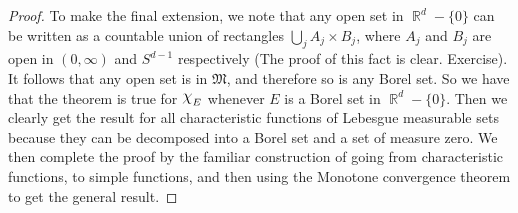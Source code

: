 \documentclass{article}
\DeclareMathOperator{\R}{\mathbb{R}}
\DeclareMathOperator{\capchi}{\raisebox{2pt}{$\mathlarger{\mathlarger{\chi}}$}}
\begin{document}
\begin{proof}
  To make the final extension, we note that any open set in $\R^d -
  \{0\}$ can be written as a countable union of rectangles $ \bigcup_j
  A_j \times B_j$, where $A_j$ and $B_j$ are open in $(0,\infty)$ and
  $S^{d-1}$ respectively (The proof of this fact is
  clear. Exercise). It follows that any open set is in $\mathfrak{M}$,
  and therefore so is any Borel set. So we have that the theorem is
  true for $\capchi_E$ whenever $E$ is a Borel set in $\R^d -
  \{0\}$. Then we clearly get the result for all characteristic
  functions of Lebesgue measurable sets because they can be decomposed
  into a Borel set and a set of measure zero. We then complete the
  proof by the familiar construction of going from characteristic
  functions, to simple functions, and then using the Monotone
  convergence theorem to get the general result.
\end{proof}
\end{document}
